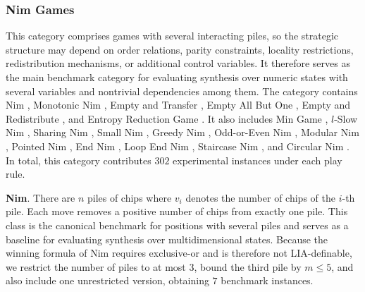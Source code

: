 \documentclass[review]{elsarticle}
\newcommand{\set}[1]{\{ #1 \}}
\newcommand{\tuple}[1]{\langle {#1} \rangle}
\newcommand{\true}{\top}
\newcommand{\statevar}{\mathcal{X}}
\newcommand{\act}{\mathcal{A}}
\newcommand{\constraint}{\mathcal{C}}
\newcommand{\estate}{\mathcal{E}}
\newcommand{\pre}{\mathtt{pre}}
\newcommand{\eff}{\mathtt{eff}}
\begin{document}
{\color{red}\subsubsection{Nim Games}}
{\color{red}This category comprises games with several interacting piles, so the strategic structure may depend on order relations, parity constraints, locality restrictions, redistribution mechanisms, or additional control variables.}
{\color{red}It therefore serves as the main benchmark category for evaluating synthesis over numeric states with several variables and nontrivial dependencies among them.}
{\color{red}The category contains Nim \cite{Bou1901}, Monotonic Nim \cite{AhnCCEFGGKMPS2017}, Empty and Transfer \cite{Fer1998}, Empty All But One \cite{Fer1998}, Empty and Redistribute \cite{Fer1998}, and Entropy Reduction Game \cite{Fer1998}.}
{\color{red}It also includes Min Game \cite{CaiH2010}, $l$-Slow Nim \cite{AhnCCEFGGKMPS2017}, Sharing Nim \cite{Ho2016}, Small Nim \cite{BerCG2001}, Greedy Nim \cite{AlbN2004}, Odd-or-Even Nim \cite{SmiS2002}, Modular Nim \cite{GavS2004}, Pointed Nim \cite{AlbN2004}, End Nim \cite{AlbN2001}, Loop End Nim \cite{AlbN2001}, Staircase Nim \cite{Spr1937}, and Circular Nim \cite{DufH2013}.}
{\color{red}In total, this category contributes $302$ experimental instances under each play rule.}

{\color{red}\textbf{Nim}. There are $n$ piles of chips where $v_i$ denotes the number of chips of the $i$-th pile.}
{\color{red}Each move removes a positive number of chips from exactly one pile.}
{\color{red}This class is the canonical benchmark for positions with several piles and serves as a baseline for evaluating synthesis over multidimensional states.}
{\color{red}Because the winning formula of Nim requires exclusive-or and is therefore not LIA-definable, we restrict the number of piles to at most $3$, bound the third pile by $m \le 5$, and also include one unrestricted version, obtaining $7$ benchmark instances.}
\end{document}
